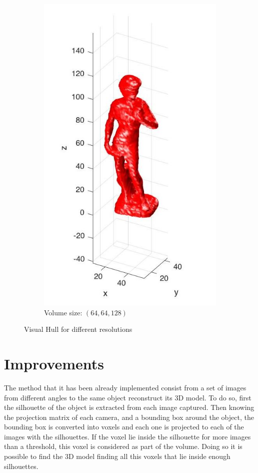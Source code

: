 \documentclass{ethz_report}
\begin{document}
\begin{figure}[H]
\begin{subfigure}[b]{.5\textwidth}
  \includegraphics[width=.8\linewidth]{images/visual_hull_high}
  \caption{Volume size: $(64, 64, 128)$}
\end{subfigure}
\caption{Visual Hull for different resolutions}
\label{fig:visual_hull}
\end{figure}

\section*{Improvements}

The method that it has been already implemented consist from a set of images from different angles to the same object reconstruct its 3D model.
To do so, first the silhouette of the object is extracted from each image captured.
Then knowing the projection matrix of each camera, and a bounding box around the object, the bounding box is converted into voxels and each one is projected to each of the images with the silhouettes.
If the voxel lie inside the silhouette for more images than a threshold, this voxel is considered as part of the volume.
Doing so it is possible to find the 3D model finding all this voxels that lie inside enough silhouettes.
\end{document}
